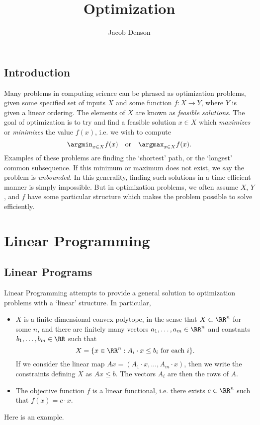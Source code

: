 

\title{Optimization}
\author{Jacob Denson}



\maketitle
\tableofcontents
{}

\chapter{Introduction}

Many problems in computing science can be phrased as optimization problems, given some specified set of inputs $X$ and some function $f: X \to Y$, where $Y$ is given a linear ordering. The elements of $X$ are known as \emph{feasible solutions}. The goal of optimization is to try and find a feasible solution $x \in X$ which \emph{maximizes} or \emph{minimizes} the value $f(x)$, i.e. we wish to compute
%
\[ \argmin_{x \in X} f(x)\quad\text{or}\quad\argmax_{x \in X} f(x). \]
%  
Examples of these problems are finding the `shortest' path, or the `longest' common subsequence. If this minimum or maximum does not exist, we say the problem is \emph{unbounded}. In this generality, finding such solutions in a time efficient manner is simply impossible. But in optimization problems, we often assume $X$, $Y$, and $f$ have some particular structure which makes the problem possible to solve efficiently.

\part{Linear Programming}

\chapter{Linear Programs}

Linear Programming attempts to provide a general solution to optimization problems with a `linear' structure. In particular,
%
\begin{itemize}
    \item $X$ is a finite dimensional convex polytope, in the sense that $X \subset \RR^n$ for some $n$, and there are finitely many vectors $a_1, \dots, a_m \in \RR^n$ and constants $b_1, \dots, b_m \in \RR$ such that
    \[ X = \{ x \in \RR^n: A_i \cdot x \leq b_i\ \text{for each $i$} \}. \]
    If we consider the linear map $Ax = (A_1 \cdot x, \dots, A_m \cdot x)$, then we write the constraints defining $X$ as $Ax \leq b$. The vectors $A_i$ are then the rows of $A$.

    \item The objective function $f$ is a linear functional, i.e. there exists $c \in \RR^n$ such that $f(x) = c \cdot x$.
\end{itemize}
%
Here is an example.

